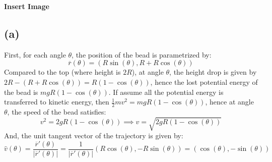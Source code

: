 \documentclass{article}
\newcommand{\br}{\overline{r}}
\newcommand{\bF}{\overline{F}}
\begin{document}
\begin{comment}
\hfil

Finally, for the hoop to rise, the net vertical force on it must be directed upward. Since the only vertical forces on the hoop are $\bF_h^{(y)}$ and gravity force $-Mg\hat{y}$, the net vertical force on the hoop is:
$$\bF_h^{(y)}-Mg\hat{y} = \left(mg(-4\cos^2(\theta)+4\cos(\theta)-2)-Mg\right)\hat{y}$$
However, if calculate the maximum of the term $-4\cos^2(\theta)+4\cos(\theta)-2$ in the domain $\theta\in [0,\frac{\pi}{2}]$, first taking the derivative being $0$ we get:
$$8\cos(\theta)\sin(\theta)-4\sin(\theta) = 0,\quad 4\sin(\theta)(2\cos(\theta)-1)=0$$
Which, $\sin(\theta)=0$ (where $\theta=0$), or $\cos(\theta)=\frac{1}{2}$ must be satisfied.

So, the absolute maximum of this expression must occur at $\theta=0,\ \theta=\frac{\pi}{2}$, or $\cos(\theta)=\frac{1}{2}$. However, plugging into the expression, we get:
$$\theta=0\implies -4\cos^2(\theta)+4\cos(\theta)-2 = -4+4-2 = -2$$
$$\theta=\frac{\pi}{2}\implies -4\cos^2(\theta)+4\cos(\theta)-2=-4\cdot 0+4\cdot 0-2 = -2$$
$$\cos(\theta)=\frac{1}{2}\implies -4\cos^2(\theta)+4\cos(\theta)-2 = -4\cdot\frac{1}{4}+4\cdot\frac{1}{2}-2 = -1$$
Since all the possible maximum values are negative, that expression is negative.

However, since $m,M,g$ are all positive, the expression $mg(-4\cos^2(\theta)+4\cos(\theta)-2)-Mg<0$ (since both $mg, Mg$ are multiplied with a negative value regardless of $\theta$), hence the vertical forces applied on the hoop is always directed downward, showing that it's not possible for the hoop to rise off the ground.
\end{comment}

\textbf{Insert Image}
\subsection*{(a)}
First, for each angle $\theta$, the position of the bead is parametrized by:
$$\br(\theta)=(R\sin(\theta), R+R\cos(\theta))$$
Compared to the top (where height is $2R$), at angle $\theta$, the height drop is given by $2R-(R+R\cos(\theta)) = R(1-\cos(\theta))$, hence the lost potential energy of the bead is $mgR(1-\cos(\theta))$. If assume all the potential energy is transferred to kinetic energy, then $\frac{1}{2}mv^2 = mgR(1-\cos(\theta))$, hence at angle $\theta$, the speed of the bead satisfies:
$$v^2 = 2gR(1-\cos(\theta))\implies v=\sqrt{2gR(1-\cos(\theta))}$$
And, the unit tangent vector of the trajectory is given by:
$$\hat{v}(\theta)=\frac{\br'(\theta)}{|\br'(\theta)|} = \frac{1}{|\br'(\theta)|}(R\cos(\theta), -R\sin(\theta)) = (\cos(\theta),-\sin(\theta))$$
\end{document}
